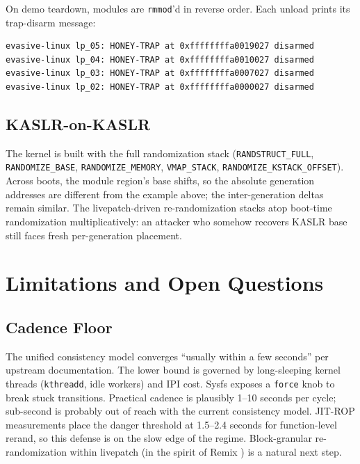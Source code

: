 \documentclass[10pt,letterpaper]{article}
\begin{document}
On demo teardown, modules are \texttt{rmmod}'d in reverse order. Each
unload prints its trap-disarm message:

\begin{lstlisting}
evasive-linux lp_05: HONEY-TRAP at 0xffffffffa0019027 disarmed
evasive-linux lp_04: HONEY-TRAP at 0xffffffffa0010027 disarmed
evasive-linux lp_03: HONEY-TRAP at 0xffffffffa0007027 disarmed
evasive-linux lp_02: HONEY-TRAP at 0xffffffffa0000027 disarmed
\end{lstlisting}

\subsection{KASLR-on-KASLR}

The kernel is built with the full randomization stack
(\texttt{RANDSTRUCT\_FULL}, \texttt{RANDOMIZE\_BASE},
\texttt{RANDOMIZE\_MEMORY}, \texttt{VMAP\_STACK},
\texttt{RANDOMIZE\_KSTACK\_OFFSET}). Across boots, the module region's
base shifts, so the absolute generation addresses are different from
the example above; the inter-generation deltas remain similar. The
livepatch-driven re-randomization stacks atop boot-time randomization
multiplicatively: an attacker who somehow recovers KASLR base still
faces fresh per-generation placement.

\section{Limitations and Open Questions}
\label{sec:limitations}

\subsection{Cadence Floor}

The unified consistency model \cite{poimboeuf_consistency} converges
``usually within a few seconds'' per upstream documentation. The
lower bound is governed by long-sleeping kernel threads
(\texttt{kthreadd}, idle workers) and IPI cost. Sysfs exposes a
\texttt{force} knob to break stuck transitions. Practical cadence is
plausibly 1--10 seconds per cycle; sub-second is probably out of
reach with the current consistency model. JIT-ROP measurements
\cite{ahmed_rerand} place the danger threshold at 1.5--2.4 seconds
for function-level rerand, so this defense is on the slow edge of
the regime. Block-granular re-randomization within livepatch (in the
spirit of Remix \cite{remix}) is a natural next step.
\end{document}
